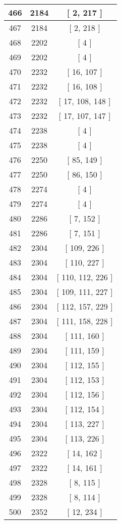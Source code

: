 \begin{center}
\begin{longtable}[H]{|| c c c ||}
\hline
466 & 2184 & [ 2, 217 ] \\ 
\hline
467 & 2184 & [ 2, 218 ] \\ 
\hline
468 & 2202 & [ 4 ] \\ 
\hline
469 & 2202 & [ 4 ] \\ 
\hline
470 & 2232 & [ 16, 107 ] \\ 
\hline
471 & 2232 & [ 16, 108 ] \\ 
\hline
472 & 2232 & [ 17, 108, 148 ] \\ 
\hline
473 & 2232 & [ 17, 107, 147 ] \\ 
\hline
474 & 2238 & [ 4 ] \\ 
\hline
475 & 2238 & [ 4 ] \\ 
\hline
476 & 2250 & [ 85, 149 ] \\ 
\hline
477 & 2250 & [ 86, 150 ] \\ 
\hline
478 & 2274 & [ 4 ] \\ 
\hline
479 & 2274 & [ 4 ] \\ 
\hline
480 & 2286 & [ 7, 152 ] \\ 
\hline
481 & 2286 & [ 7, 151 ] \\ 
\hline
482 & 2304 & [ 109, 226 ] \\ 
\hline
483 & 2304 & [ 110, 227 ] \\ 
\hline
484 & 2304 & [ 110, 112, 226 ] \\ 
\hline
485 & 2304 & [ 109, 111, 227 ] \\ 
\hline
486 & 2304 & [ 112, 157, 229 ] \\ 
\hline
487 & 2304 & [ 111, 158, 228 ] \\ 
\hline
488 & 2304 & [ 111, 160 ] \\ 
\hline
489 & 2304 & [ 111, 159 ] \\ 
\hline
490 & 2304 & [ 112, 155 ] \\ 
\hline
491 & 2304 & [ 112, 153 ] \\ 
\hline
492 & 2304 & [ 112, 156 ] \\ 
\hline
493 & 2304 & [ 112, 154 ] \\ 
\hline
494 & 2304 & [ 113, 227 ] \\ 
\hline
495 & 2304 & [ 113, 226 ] \\ 
\hline
496 & 2322 & [ 14, 162 ] \\ 
\hline
497 & 2322 & [ 14, 161 ] \\ 
\hline
498 & 2328 & [ 8, 115 ] \\ 
\hline
499 & 2328 & [ 8, 114 ] \\ 
\hline
500 & 2352 & [ 12, 234 ] \\ 

\end{longtable}
\end{center}
